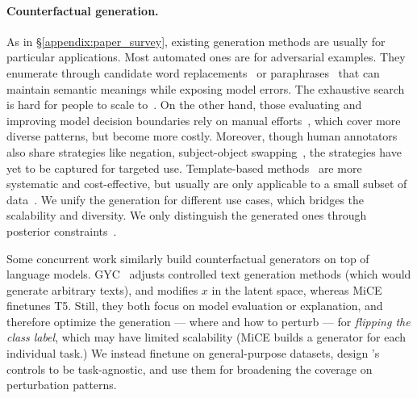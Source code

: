 \paragraph{Counterfactual generation.}
As in \S\ref{appendix:paper_survey}, existing generation methods are usually for particular applications.
Most automated ones are for adversarial examples. 
They enumerate through candidate word replacements~\cite{alzantot2018generating, garg2020bae} or paraphrases~\cite{iyyer2018adversarial, malandrakis-etal-2019-controlled} that can maintain semantic meanings while exposing model errors.
The exhaustive search is hard for people to scale to~\cite{ribeiro2018sear}.
On the other hand, those evaluating and improving model decision boundaries rely on manual efforts~\cite{checklist:acl20}, which cover more diverse patterns, but become more costly.
Moreover, though human annotators also share strategies like negation, subject-object swapping~\cite{kaushik2019learning, gardner2020contrast}, the strategies have yet to be captured for targeted use.
Template-based methods~\cite{mccoy2019right, nie2019analyzing} are more systematic and cost-effective, but usually are only applicable to a small subset of data~\cite{li2020linguistically}.
We unify the generation for different use cases, which bridges the scalability and diversity.
We only distinguish the generated ones through posterior constraints~\cite{morris2020textattack, alzantot-etal-2018-generating}.

Some concurrent work similarly build counterfactual generators on top of language models.
GYC~\cite{madaan2020generate} adjusts controlled text generation methods (which would generate arbitrary texts), and modifies $x$ in the latent space, whereas MiCE~\cite{ross2020explaining} finetunes T5.
Still, they both focus on model evaluation or explanation, and therefore optimize the generation --- where and how to perturb --- for \emph{flipping the class label}, which may have limited scalability (\eg MiCE builds a generator for each individual task.)
We instead finetune \sysname on general-purpose datasets, design \sysname's controls to be task-agnostic, and use them for broadening the coverage on perturbation patterns.






